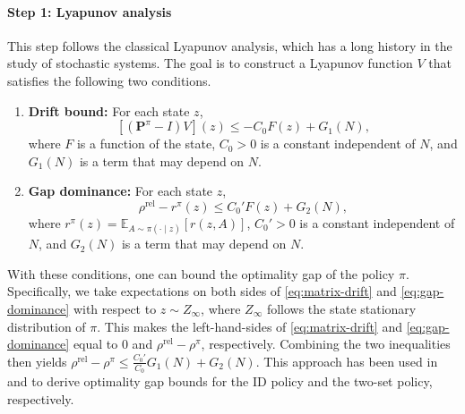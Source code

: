 \documentclass[mnsc,nonblindrev]{informs3}
\newcommand{\E}{\mathbb{E}}
\newcommand{\bp}{\bm{P}}
\newcommand{\rhorel}{\rho^{\mathrm{rel}}}
\begin{document}
\paragraph{Step 1: Lyapunov analysis}
This step follows the classical Lyapunov analysis, which has a long history in the study of stochastic systems.
The goal is to construct a Lyapunov function $V$ that satisfies the following two conditions.
\begin{enumerate}[label=(\textbf{C\arabic*}),leftmargin=3.5em, topsep=0em,itemsep=0em]
    \item\label{cond:drift} \textbf{Drift bound:}
    For each state $z$,
    \begin{equation}\label{eq:matrix-drift}
    [(\bp^{\pi}-I)V](z)\le -C_0 F(z)+G_1(N),
    \end{equation}
    where $F$ is a function of the state, $C_0>0$ is a constant independent of $N$, and $G_1(N)$ is a term that may depend on $N$.
    \item\label{cond:dominance} \textbf{Gap dominance:} For each state $z$,
    \begin{equation}\label{eq:gap-dominance}
        \rho^{\mathrm{rel}}-r^\pi(z)\le C_0'F(z)+G_2(N),
    \end{equation}
    where \(r^{\pi}(z)=\E_{A\sim\pi(\cdot\mid z)}[r(z,A)]\), $C_0'>0$ is a constant independent of $N$, and $G_2(N)$ is a term that may depend on $N$.
\end{enumerate}

With these conditions, one can bound the optimality gap of the policy $\pi$.
Specifically, we take expectations on both sides of \eqref{eq:matrix-drift} and \eqref{eq:gap-dominance} with respect to $z\sim Z_{\infty}$, where $Z_{\infty}$ follows the state stationary distribution of $\pi$.
This makes the left-hand-sides of \eqref{eq:matrix-drift} and \eqref{eq:gap-dominance} equal to $0$ and $\rhorel-\rho^{\pi}$, respectively.
Combining the two inequalities then yields $\rhorel-\rho^{\pi} \le \frac{C_0'}{C_0}G_1(N)+G_2(N).$
This approach has been used in ~\citet{zhang2025projection} and \citet{hong2024achieving} to derive optimality gap bounds for the ID policy and the two-set policy, respectively.
\end{document}
